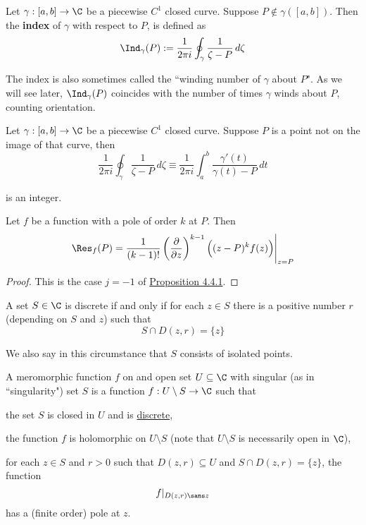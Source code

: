 \label{bfdcc82}

Let $\gamma:[a,b]\to\C$ be a piecewise $C^1$ closed curve. Suppose
$P\notin\gamma([a,b])$. Then the \textbf{index} of $\gamma$ with respect to
$P$, is defined as
$$
  \Ind_\gamma(P):=\frac1{2\pi i}\oint_\gamma\frac1{\zeta-P}\,d\zeta
$$

The index is also sometimes called the ``winding number of $\gamma$ about $P$".
As we will see later, $\Ind_\gamma(P)$ coincides with the number of times
$\gamma$ winds about $P$, counting orientation.

\label{ff34baf}

Let $\gamma:[a,b]\to\C$ be a piecewise $C^1$ closed curve. Suppose $P$ is a
point not on the image of that curve, then
$$
  \frac1{2\pi i}\oint_\gamma\frac1{\zeta-P}\,d\zeta
  \equiv
  \frac1{2\pi i}\int_a^b\frac{\gamma'(t)}{\gamma(t)-P}\,dt
$$

is an integer.

\label{a264ecd}

Let $f$ be a function with a pole of order $k$ at $P$. Then
$$
  \Res_f(P)=\frac1{(k-1)!}\left(\frac\partial{\partial z}\right)^{k-1}
  \Big((z-P)^kf(z)\Big)\Bigg|_{z=P}
$$

\begin{proof}
  This is the case $j=-1$ of \href{c1d2d0c}{Proposition 4.4.1}.
\end{proof}

\label{d1b9ae6}

A set $S\in\C$ is discrete if and only if for each $z\in S$ there is a positive
number $r$ (depending on $S$ and $z$) such that
$$
  S\cap D(z,r)=\{z\}
$$

We also say in this circumstance that $S$ consists of isolated points.

\label{cfba843}

A meromorphic function $f$ on and open set $U\subseteq\C$ with singular (as in
``singularity") set $S$ is a function $f:U\setminus S\to\C$ such that
\begin{enumerata}
  \item the set $S$ is closed in $U$ and is \href{d1b9ae6}{discrete},
  \item the function $f$ is holomorphic on $U\setminus S$ (note that $U\setminus S$ is
  necessarily open in $\C$),
  \item for each $z\in S$ and $r>0$ such that $D(z,r)\subseteq U$ and $S\cap
  D(z,r)=\{z\}$, the function
  $$
    f|_{D(z,r)\sans z}
  $$
  has a (finite order) pole at $z$.
\end{enumerata}

